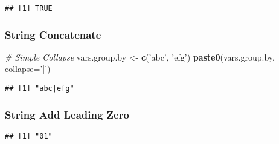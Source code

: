 \documentclass[
]{book}
\newenvironment{Shaded}{\begin{snugshade}}{\end{snugshade}}
\newcommand{\CommentTok}[1]{\textcolor[rgb]{0.56,0.35,0.01}{\textit{#1}}}
\newcommand{\DataTypeTok}[1]{\textcolor[rgb]{0.13,0.29,0.53}{#1}}
\newcommand{\DecValTok}[1]{\textcolor[rgb]{0.00,0.00,0.81}{#1}}
\newcommand{\KeywordTok}[1]{\textcolor[rgb]{0.13,0.29,0.53}{\textbf{#1}}}
\newcommand{\NormalTok}[1]{#1}
\newcommand{\StringTok}[1]{\textcolor[rgb]{0.31,0.60,0.02}{#1}}
\begin{document}
\begin{verbatim}
## [1] TRUE
\end{verbatim}

\hypertarget{string-concatenate}{%
\subsubsection{String Concatenate}\label{string-concatenate}}

\begin{Shaded}
\begin{Highlighting}[]
\CommentTok{# Simple Collapse}
\NormalTok{vars.group.by <-}\StringTok{ }\KeywordTok{c}\NormalTok{(}\StringTok{'abc'}\NormalTok{, }\StringTok{'efg'}\NormalTok{)}
\KeywordTok{paste0}\NormalTok{(vars.group.by, }\DataTypeTok{collapse=}\StringTok{'|'}\NormalTok{)}
\end{Highlighting}
\end{Shaded}

\begin{verbatim}
## [1] "abc|efg"
\end{verbatim}

\hypertarget{string-add-leading-zero}{%
\subsubsection{String Add Leading Zero}\label{string-add-leading-zero}}

\begin{Shaded}
\end{Shaded}

\begin{verbatim}
## [1] "01"
\end{verbatim}

\begin{Shaded}
\end{Shaded}
\end{document}
